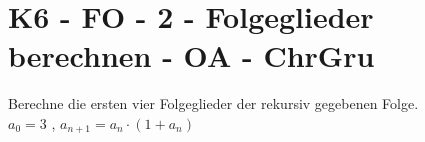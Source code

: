 \section{K6 - FO - 2 - Folgeglieder berechnen - OA - ChrGru}

\begin{beispiel}[K6 - FO]{1}
Berechne die ersten vier Folgeglieder der rekursiv gegebenen Folge. \\
$a_0=3$ , $a_{n+1}=a_n \cdot (1+a_n)$ \\
\end{beispiel}